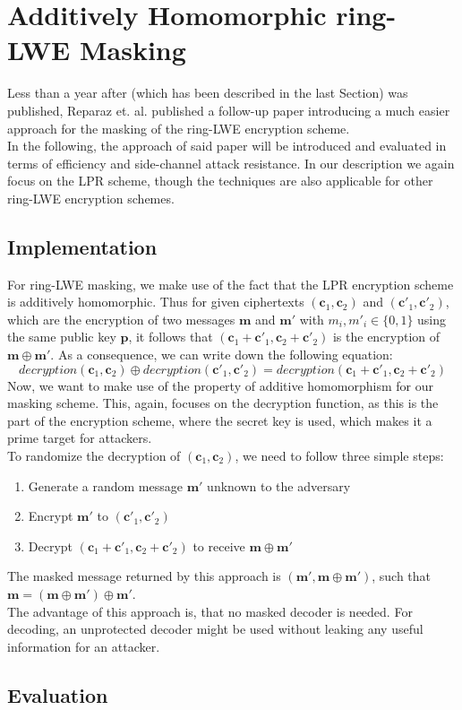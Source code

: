 %
%

\chapter{Additively Homomorphic ring-LWE Masking}
Less than a year after \cite{maskedRing} (which has been described in the last Section) was published, Reparaz et. al. published a follow-up paper \cite{Reparaz2016} introducing a much easier approach for the masking of the \ac{ring-LWE} encryption scheme.\\
In the following, the approach of said paper will be introduced and evaluated in terms of efficiency and side-channel attack resistance. In our description we again focus on the \ac{LPR} scheme, though the techniques are also applicable for other \ac{ring-LWE} encryption schemes.

\section{Implementation}
For \ac{ring-LWE} masking, we make use of the fact that the \ac{LPR} encryption scheme is additively homomorphic. Thus for given ciphertexts \((\textbf{c}_1, \textbf{c}_2)\) and \((\textbf{c}'_1, \textbf{c}'_2)\), which are the encryption of two messages \(\textbf{m}\) and \(\textbf{m}'\) with \(m_i, m'_i \in \{0,1\}\) using the same public key \(\textbf{p}\), it follows that \((\textbf{c}_1+\textbf{c}'_1, \textbf{c}_2+\textbf{c}'_2)\) is the encryption of \(\textbf{m} \oplus \textbf{m}'\). As a consequence, we can write down the following equation:
\begin{equation}
	decryption(\textbf{c}_1,\textbf{c}_2) \oplus decryption(\textbf{c}'_1,\textbf{c}'_2) = decryption(\textbf{c}_1 + \textbf{c}'_1,\textbf{c}_2 + \textbf{c}'_2)
\end{equation}
Now, we want to make use of the property of additive homomorphism for our masking scheme. This, again, focuses on the decryption function, as this is the part of the encryption scheme, where the secret key is used, which makes it a prime target for attackers.\\
To randomize the decryption of \((\textbf{c}_1, \textbf{c}_2)\), we need to follow three simple steps:
\begin{enumerate}
\item Generate a random message \(\textbf{m}'\) unknown to the adversary
\item Encrypt \(\textbf{m}'\) to \((\textbf{c}'_1, \textbf{c}'_2)\)
\item Decrypt \((\textbf{c}_1+\textbf{c}'_1, \textbf{c}_2+\textbf{c}'_2)\) to receive \(\textbf{m} \oplus \textbf{m}'\)
\end{enumerate}
The masked message returned by this approach is \((\textbf{m}', \textbf{m} \oplus \textbf{m}')\), such that \(\textbf{m} = (\textbf{m} \oplus \textbf{m}') \oplus \textbf{m}'\).\\
The advantage of this approach is, that no masked decoder is needed. For decoding, an unprotected decoder might be used without leaking any useful information for an attacker.

\section{Evaluation}